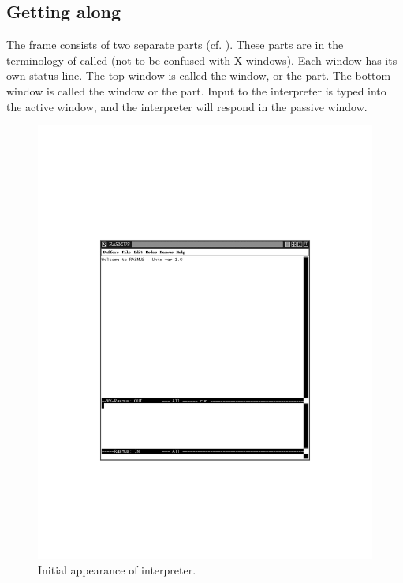 \subsection{Getting along}
The \RAS{} frame consists of two separate parts (cf.
). These parts are in the terminology of
\EMACS{} called  (not to be confused with X-windows).
Each window has its own status-line. The top window is called the
 window, or the  part. The bottom
window is called the  window or the 
part. Input to the interpreter is typed into the active window, and
the interpreter will respond in the passive window.
\begin{figure}[H]
\centerline{\includegraphics[]{rasfig-initial.pdf}}
\caption{Initial appearance of interpreter.}
\label{initialinterpreter}
\end{figure}

